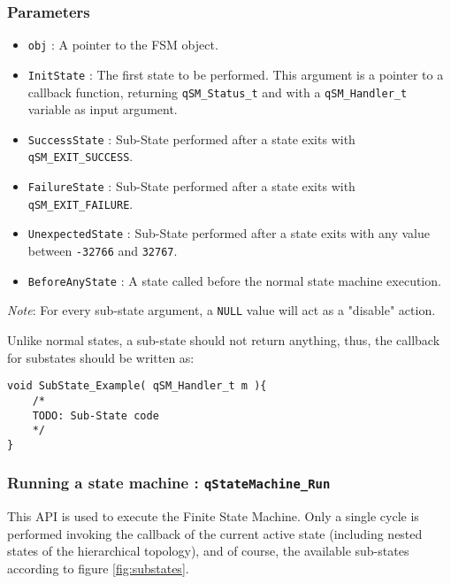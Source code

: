 \subsubsection*{Parameters}
\begin{itemize}
    \item \lstinline{obj} : A pointer to the FSM object.
    \item \lstinline{InitState} :  The first state to be performed. This argument is a pointer to a callback function, returning \lstinline{qSM_Status_t} and with a \lstinline{qSM_Handler_t} variable as input argument.
    \item \lstinline{SuccessState} :  Sub-State performed after a state exits with  \lstinline{qSM_EXIT_SUCCESS}. 
    \item \lstinline{FailureState} :  Sub-State performed after a state exits with  \lstinline{qSM_EXIT_FAILURE}. 
    \item \lstinline{UnexpectedState} :  Sub-State performed after a state exits with any value between \lstinline{-32766} and \lstinline{32767}. 
    \item \lstinline{BeforeAnyState} :  A state called before the normal state machine execution.
\end{itemize}  

\begin{tcolorbox}
\ArrowBoldDownRight \textit{Note}: For every sub-state argument, a \lstinline{NULL} value will act as a "disable" action.
\end{tcolorbox}

Unlike normal states, a sub-state should not return anything, thus, the callback for substates should be written as: \\

\begin{lstlisting}[style=CStyle]
void SubState_Example( qSM_Handler_t m ){
    /*
    TODO: Sub-State code
    */
}
\end{lstlisting}  

\subsubsection{Running a state machine : \texorpdfstring{\lstinline{qStateMachine_Run}}{qStateMachine_Run} }
This API  is used to execute the Finite State Machine. Only a single cycle is performed invoking the callback of the current active state (including nested states of the hierarchical topology), and of course, the available sub-states according to figure \ref{fig:substates}. \\

